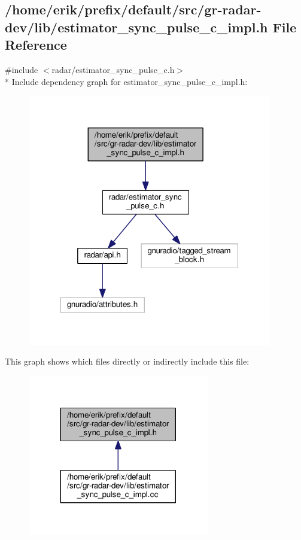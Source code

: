 \subsection{/home/erik/prefix/default/src/gr-\/radar-\/dev/lib/estimator\+\_\+sync\+\_\+pulse\+\_\+c\+\_\+impl.h File Reference}
\label{estimator__sync__pulse__c__impl_8h}
{\ttfamily \#include $<$radar/estimator\+\_\+sync\+\_\+pulse\+\_\+c.\+h$>$}\\*
Include dependency graph for estimator\+\_\+sync\+\_\+pulse\+\_\+c\+\_\+impl.\+h\+:
\nopagebreak
\begin{figure}[H]
\begin{center}
\leavevmode
\includegraphics[width=302pt]{d0/da7/estimator__sync__pulse__c__impl_8h__incl}
\end{center}
\end{figure}
This graph shows which files directly or indirectly include this file\+:
\nopagebreak
\begin{figure}[H]
\begin{center}
\leavevmode
\includegraphics[width=224pt]{d1/d69/estimator__sync__pulse__c__impl_8h__dep__incl}
\end{center}
\end{figure}
